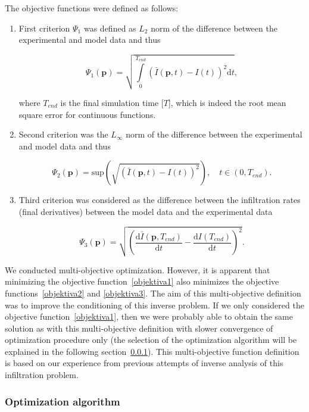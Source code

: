 \documentclass[review,times,3p,twocolumn,10pt]{elsarticle}
\newenvironment{lineq}
    {\begin{linenomath*}
    \begin{equation}
    }
    { 
    \end{equation} 
    \end{linenomath*}
    }
\newcommand{\dd}{\mathrm{d}}
\renewcommand{\vec}{\mathbf}
\begin{document}
The objective functions were defined as follows:
\begin{enumerate}[label={\bf \Roman*}.]
\item First criterion $\Psi_1$ was defined as $L_2$ norm of the difference between the  experimental and model data and thus
\begin{lineq}
\label{objektiva1}
\Psi_1 (\vec{p}) = \sqrt{\int\limits_0^{T_{end}} \left( \bar{I}(\vec{p},t) - I(t) \right)^2 \dd t},
\end{lineq}
where $T_{end}$ is the final simulation time [$T$], which is indeed the root mean square error for continuous functions. 
\item Second criterion was the $L_{\infty}$ norm of the difference between the experimental and model data and thus
\begin{lineq}
\label{objektiva2}
\Psi_2 (\vec{p}) = \mathrm{sup} \left( \sqrt{\left( \bar{I}(\vec{p},t) - I(t) \right)^2} \right), \quad  t \in (0, T_{end}).
\end{lineq}
\item Third criterion was considered as the difference between the infiltration rates (final derivatives) between the model data and the experimental data
\begin{lineq}
\label{objektiva3}
\Psi_3 (\vec{p}) =  \sqrt{\left( \frac{\dd \bar{I}(\vec{p},T_{end})}{\dd t} - \frac{\dd I(T_{end})}{\dd t} \right)^2}.
\end{lineq}


\end{enumerate}

We conducted multi-objective optimization. However, it is apparent that minimizing the objective function~\eqref{objektiva1} also minimizes the objective functions~\eqref{objektiva2} and \eqref{objektiva3}. The aim of this multi-objective definition was to improve the conditioning of this inverse problem. If we only considered the objective function~\eqref{objektiva1}, then we were probably able to obtain the same solution as with this multi-objective definition with slower convergence of optimization procedure only (the selection of the optimization algorithm will be explained in the following section~\ref{optima}). This multi-objective function definition is based on our experience from previous attempts of inverse analysis of this infiltration problem.



\subsubsection{Optimization algorithm}%
\label{optima}
\end{document}
